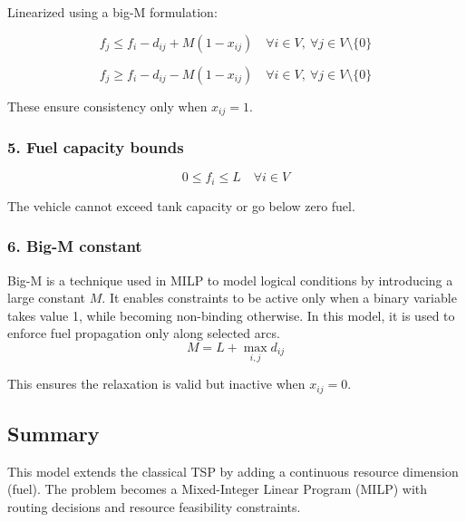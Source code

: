 \documentclass{article}
\begin{document}
Linearized using a big-M formulation:

\[
f_j \le f_i - d_{ij} + M(1 - x_{ij}) \quad \forall i \in V,\ \forall j \in V \setminus \{0\}
\]

\[
f_j \ge f_i - d_{ij} - M(1 - x_{ij}) \quad \forall i \in V,\ \forall j \in V \setminus \{0\}
\]

These ensure consistency only when $x_{ij} = 1$.

\subsubsection*{5. Fuel capacity bounds}
\[
0 \le f_i \le L \quad \forall i \in V
\]

The vehicle cannot exceed tank capacity or go below zero fuel.

\subsubsection*{6. Big-M constant}
Big-M is a technique used in MILP to model logical conditions by introducing a large constant $M$. It enables constraints to be active only when a binary variable takes value 1, while becoming non-binding otherwise. In this model, it is used to enforce fuel propagation only along selected arcs.
\[
M = L + \max_{i,j} d_{ij}
\]

This ensures the relaxation is valid but inactive when $x_{ij} = 0$.

\subsection*{Summary}
This model extends the classical TSP by adding a continuous resource dimension (fuel). The problem becomes a Mixed-Integer Linear Program (MILP) with routing decisions and resource feasibility constraints.
\end{document}
